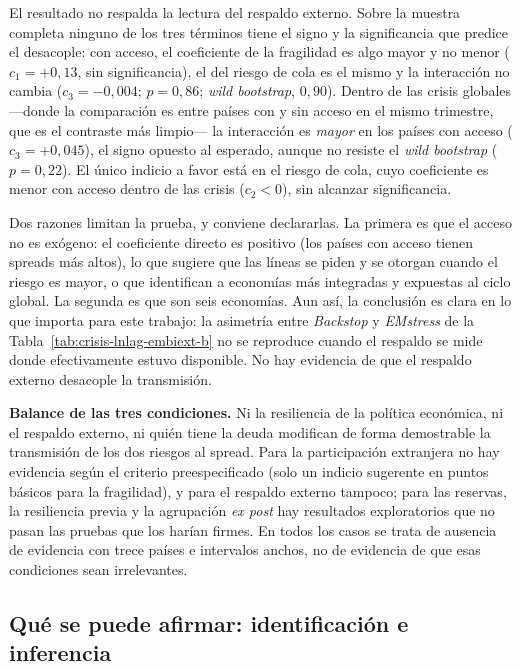 El resultado no respalda la lectura del respaldo externo. Sobre la muestra completa ninguno de los tres términos tiene el signo y la significancia que predice el desacople: con acceso, el coeficiente de la fragilidad es algo mayor y no menor ($c_1=+0{,}13$, sin significancia), el del riesgo de cola es el mismo y la interacción no cambia ($c_3=-0{,}004$; $p=0{,}86$; \textit{wild bootstrap}, $0{,}90$). Dentro de las crisis globales ---donde la comparación es entre países con y sin acceso en el mismo trimestre, que es el contraste más limpio--- la interacción es \emph{mayor} en los países con acceso ($c_3=+0{,}045$), el signo opuesto al esperado, aunque no resiste el \textit{wild bootstrap} ($p=0{,}22$). El único indicio a favor está en el riesgo de cola, cuyo coeficiente es menor con acceso dentro de las crisis ($c_2<0$), sin alcanzar significancia.

Dos razones limitan la prueba, y conviene declararlas. La primera es que el acceso no es exógeno: el coeficiente directo es positivo (los países con acceso tienen spreads más altos), lo que sugiere que las líneas se piden y se otorgan cuando el riesgo es mayor, o que identifican a economías más integradas y expuestas al ciclo global. La segunda es que son seis economías. Aun así, la conclusión es clara en lo que importa para este trabajo: la asimetría entre \textit{Backstop} y \textit{EMstress} de la Tabla~\ref{tab:crisis-lnlag-embiext-b} no se reproduce cuando el respaldo se mide donde efectivamente estuvo disponible. No hay evidencia de que el respaldo externo desacople la transmisión.

\textbf{Balance de las tres condiciones.} Ni la resiliencia de la política económica, ni el respaldo externo, ni quién tiene la deuda modifican de forma demostrable la transmisión de los dos riesgos al spread. Para la participación extranjera no hay evidencia según el criterio preespecificado (solo un indicio sugerente en puntos básicos para la fragilidad), y para el respaldo externo tampoco; para las reservas, la resiliencia previa y la agrupación \textit{ex post} hay resultados exploratorios que no pasan las pruebas que los harían firmes. En todos los casos se trata de ausencia de evidencia con trece países e intervalos anchos, no de evidencia de que esas condiciones sean irrelevantes.

\subsection{Qué se puede afirmar: identificación e inferencia}
\label{sec:identificacion}

